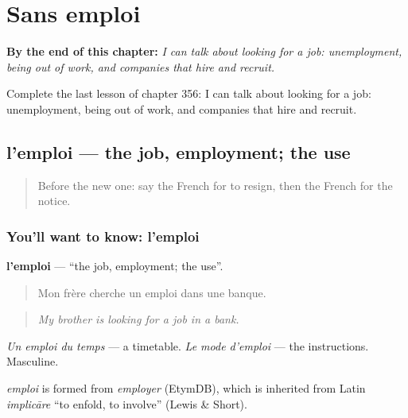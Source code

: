 
\chapter{Sans emploi}
\label{ch:fr-sans-emploi}

\begin{chapteropening}
\textbf{By the end of this chapter:} \emph{I can talk about looking for a job: unemployment, being out of work, and companies that hire and recruit.}

Complete the last lesson of chapter 356: I can talk about looking for a job: unemployment, being out of work, and companies that hire and recruit.
\end{chapteropening}

\section[l'emploi]{l'emploi — the job, employment; the use}

\label{lesson:FR-C356-emploi}



\begin{quote}
Before the new one: say the French for to resign, then the French for the notice.
\end{quote}

\subsection*{You'll want to know: l'emploi}
\textbf{l'emploi} — \textquotedblleft{}the job, employment; the use\textquotedblright{}.

\begin{quote}
Mon frère cherche un emploi dans une banque.
\end{quote}

\begin{quote}
\emph{My brother is looking for a job in a bank.}
\end{quote}

\emph{Un emploi du temps} — a timetable. \emph{Le mode d'emploi} — the instructions. Masculine.

\begin{cousinweb}
\emph{emploi} is formed from \emph{employer} (EtymDB), which is inherited from Latin \emph{implicāre} \textquotedblleft{}to enfold, to involve\textquotedblright{} (Lewis \& Short).
\end{cousinweb}

